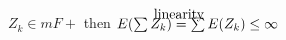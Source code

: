 \documentclass{article}
\newcommand\myeq[1]{\stackrel{\mathclap{\normalfont\mbox{#1 \vphantom{p}}}}{ = }}
\begin{document}
$Z_k \in mF+$ then $E(\sum Z_k) \myeq{linearity} \sum E(Z_k) \le \infty$
	
\end{document}
